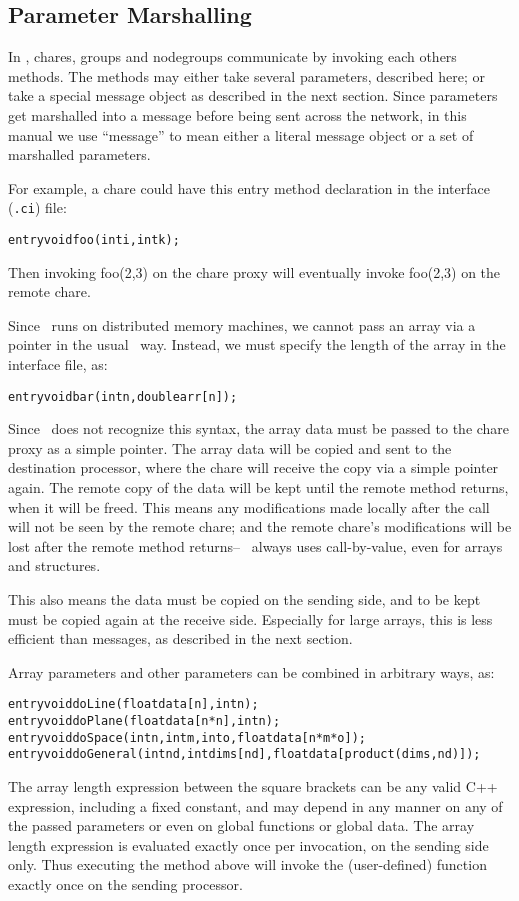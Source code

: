 \subsection{Parameter Marshalling}
\label{marshalling}

\experimental{}	
In \charmpp, chares, groups and 
nodegroups communicate by invoking each others methods. 
The methods may either take several parameters, described here; 
or take a special message object as described in the next section.
Since parameters get marshalled into a message before being
sent across the network, in this manual we use ``message''
to mean either a literal message object or a set of marshalled
parameters.

For example, a chare could have this entry method declaration in 
the interface ({\tt .ci}) file:
\begin{alltt}
  entry void foo(int i,int k);
\end{alltt}
Then invoking foo(2,3) on the chare proxy will eventually
invoke foo(2,3) on the remote chare.

Since \charmpp\ runs on distributed memory machines, we cannot
pass an array via a pointer in the usual \CC\ way.  Instead,
we must specify the length of the array in the interface file, as:
\begin{alltt}
  entry void bar(int n,double arr[n]);
\end{alltt}
Since \CC\ does not recognize this syntax, the array data
must be passed to the chare proxy as a simple pointer.
The array data will be copied and sent to the
destination processor, where the chare will receive the copy
via a simple pointer again.  The remote copy of the data
will be kept until the remote method returns, when
it will be freed.  
This means any modifications made locally after the call will not be 
seen by the remote chare; and the remote chare's modifications
will be lost after the remote method returns-- \charmpp\ always 
uses call-by-value, even for arrays and structures.  

This also means the data must be copied on the sending 
side, and to be kept must be copied again 
at the receive side.  Especially for large arrays, this 
is less efficient than messages, as described in the next section.

Array parameters and other parameters can be combined in arbitrary ways, as:
\begin{alltt}
  entry void doLine(float data[n],int n);
  entry void doPlane(float data[n*n],int n);
  entry void doSpace(int n,int m,int o,float data[n*m*o]);
  entry void doGeneral(int nd,int dims[nd],float data[product(dims,nd)]);
\end{alltt}
The array length expression between the square brackets can be 
any valid C++ expression, including a fixed constant, and may depend 
in any manner on any of the passed
parameters or even on global functions or global data.  The array length 
expression is evaluated exactly once per invocation, on the sending side only.
Thus executing the  method above will invoke the 
(user-defined)  function exactly once on the sending
processor.

